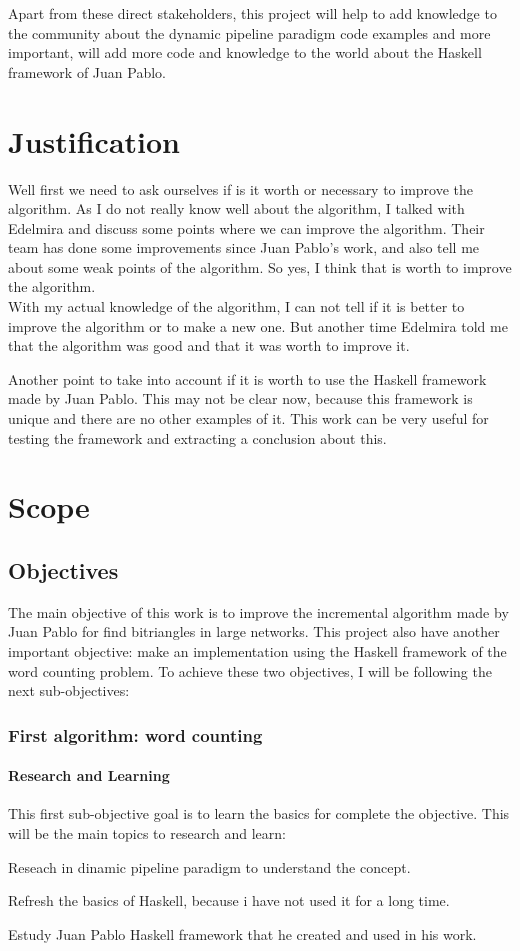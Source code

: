 Apart from these direct stakeholders, this project will help to add knowledge to the community about the dynamic pipeline paradigm code examples and more important, will add more code and knowledge to the world about the Haskell framework of Juan Pablo.

\chapter{Justification}
Well first we need to ask ourselves if is it worth or necessary to improve the algorithm.
As I do not really know well about the algorithm, I talked with Edelmira and discuss some points where we can improve the algorithm.
Their team has done some improvements since Juan Pablo's work, and also tell me about some weak points of the algorithm.
So yes, I think that is worth to improve the algorithm.\\

With my actual knowledge of the algorithm, I can not tell if it is better to improve the algorithm or to make a new one.
But another time Edelmira told me that the algorithm was good and that it was worth to improve it.

Another point to take into account if it is worth to use the Haskell framework made by Juan Pablo.
This may not be clear now, because this framework is unique and there are no other examples of it.
This work can be very useful for testing the framework and extracting a conclusion about this.
\chapter{Scope}
\section{Objectives}
The main objective of this work is to improve the incremental algorithm made by Juan Pablo for find bitriangles in large networks.
This project also have another important objective: make an implementation using the Haskell framework of the word counting problem.
To achieve these two objectives, I will be following the next sub-objectives:
\subsection*{First algorithm: word counting}
\subsubsection*{Research and Learning}
This first sub-objective goal is to learn the basics for complete the objective.
This will be the main topics to research and learn:
\begin{list}{-}{}
     \item Reseach in dinamic pipeline paradigm to understand the concept.
    \item Refresh the basics of Haskell, because i have not used it for a long time.
     \item Estudy Juan Pablo Haskell framework that he created and used in his work.
\end{list}
